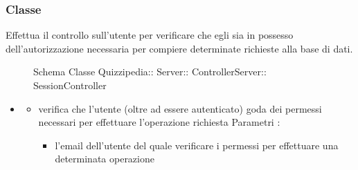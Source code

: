 \subsubsection{Classe }
Effettua il controllo sull'utente per verificare che egli sia in possesso dell'autorizzazione necessaria per compiere determinate richieste alla base di dati.
\begin{figure}[H]
\centering
\noindent{}
\caption[Schema Classe SessionController]{Schema Classe Quizzipedia:: Server:: ControllerServer:: SessionController}
\end{figure}
\begin{itemize}
\item {}
\begin{itemize}
\item {}
\newline
verifica che l'utente (oltre ad essere autenticato) goda dei permessi necessari per effettuare l'operazione richiesta
\newline
Parametri :
\begin{itemize}
\item {}
\newline
l'email dell'utente del quale verificare i permessi per effettuare una determinata operazione
\end{itemize}
\end{itemize}
\end{itemize}
